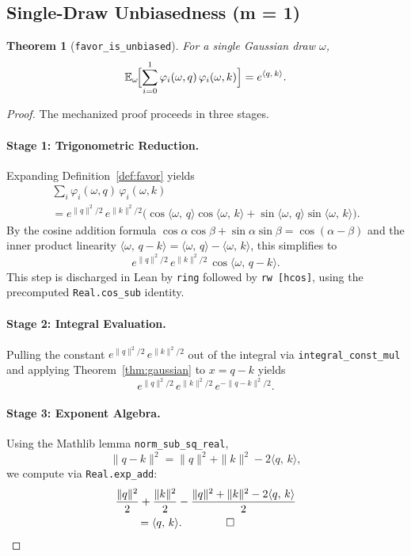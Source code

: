 \documentclass[11pt,a4paper,twocolumn]{article}
\newtheorem{theorem}{Theorem}[section]
\theoremstyle{definition}
\theoremstyle{remark}
\newcommand{\E}{\mathbb{E}}
\newcommand{\ip}[2]{\langle #1,\, #2 \rangle}
\newcommand{\leancode}[1]{\texttt{\color{leanblue}#1}}
\begin{document}
\subsection{Single-Draw Unbiasedness (m = 1)}

\begin{theorem}[\leancode{favor\_is\_unbiased}]
\label{thm:m1}
For a single Gaussian draw $\omega$,
\begin{equation}
  \E_\omega\!\Bigl[\sum_{i=0}^{1}
    \varphi_i(\omega, q)\,\varphi_i(\omega, k)\Bigr]
  = e^{\ip{q}{k}}.
\end{equation}
\end{theorem}

\begin{proof}
The mechanized proof proceeds in three stages.

\paragraph{Stage 1: Trigonometric Reduction.}
Expanding Definition~\ref{def:favor} yields
\begin{multline}
  \sum_{i} \varphi_i(\omega,q)\,\varphi_i(\omega,k) \\
  = e^{\|q\|^2\!/2}\,e^{\|k\|^2\!/2}
    \bigl(\cos\ip{\omega}{q}\cos\ip{\omega}{k}
    + \sin\ip{\omega}{q}\sin\ip{\omega}{k}\bigr).
\end{multline}
By the cosine addition formula
$\cos\alpha\cos\beta + \sin\alpha\sin\beta = \cos(\alpha - \beta)$
and the inner product linearity
$\ip{\omega}{q-k} = \ip{\omega}{q} - \ip{\omega}{k}$, this simplifies to
\begin{equation}
  e^{\|q\|^2\!/2}\,e^{\|k\|^2\!/2}\,\cos\ip{\omega}{q-k}.
\end{equation}
This step is discharged in Lean by \texttt{ring} followed by
\texttt{rw~[hcos]}, using the precomputed
\leancode{Real.cos\_sub} identity.

\paragraph{Stage 2: Integral Evaluation.}
Pulling the constant $e^{\|q\|^2\!/2}\,e^{\|k\|^2\!/2}$ out of the integral
via \leancode{integral\_const\_mul} and applying
Theorem~\ref{thm:gaussian} to $x = q - k$ yields
\begin{equation}
  e^{\|q\|^2\!/2}\,e^{\|k\|^2\!/2}\,e^{-\|q-k\|^2\!/2}.
\end{equation}

\paragraph{Stage 3: Exponent Algebra.}
Using the Mathlib lemma \leancode{norm\_sub\_sq\_real},
\begin{equation}
  \|q - k\|^2 = \|q\|^2 + \|k\|^2 - 2\ip{q}{k},
\end{equation}
we compute via \leancode{Real.exp\_add}:
\begin{align}
  &\frac{\|q\|^2}{2} + \frac{\|k\|^2}{2}
    - \frac{\|q\|^2 + \|k\|^2 - 2\ip{q}{k}}{2} \notag\\
  &\qquad = \ip{q}{k}. \qquad\qed
\end{align}
\end{proof}
\end{document}
